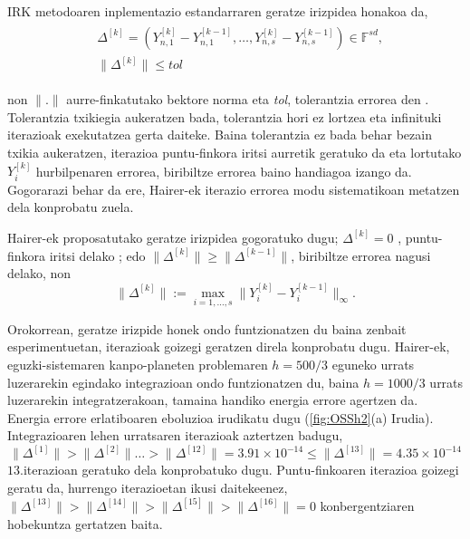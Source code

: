 IRK metodoaren inplementazio estandarraren geratze irizpidea honakoa da,
\begin{align}
\begin{split}
&\Delta^{[k]}=(Y_{n,1}^{[k]}-Y_{n,1}^{[k-1]},\dots,Y_{n,s}^{[k]}-Y_{n,s}^{[k-1]}) \in \mathbb{F}^{sd},\\
&\|\Delta^{[k]}\| \leqslant tol
\end{split}
\end{align} 

non $\|.\|$ aurre-finkatutako bektore norma eta \emph{tol}, tolerantzia errorea den . Tolerantzia txikiegia aukeratzen bada, tolerantzia hori ez lortzea eta infinituki iterazioak exekutatzea gerta daiteke. Baina tolerantzia ez bada behar bezain txikia aukeratzen, iterazioa puntu-finkora iritsi aurretik geratuko da eta lortutako $Y_i^{[k]}$ hurbilpenaren errorea, biribiltze errorea baino  handiagoa izango da. Gogorarazi behar da ere, Hairer-ek \cite{Hairer2008} iterazio errorea modu sistematikoan metatzen dela konprobatu zuela.   

Hairer-ek proposatutako geratze irizpidea gogoratuko dugu; $\Delta^{[k]} = 0$ , puntu-finkora iritsi delako ;  edo   $\|\Delta^{[k]}\| \geqslant \|\Delta^{[k-1]}\|$, biribiltze errorea nagusi delako,
non
\begin{equation*}
\|\Delta^{[k]}\|:= \max_{i=1,\dots,s} \|Y_i^{[k]}-Y_i^{[k-1]}\|_{\infty}.
\end{equation*}


Orokorrean, geratze irizpide honek ondo funtzionatzen du baina zenbait esperimentuetan, iterazioak goizegi geratzen direla konprobatu dugu. Hairer-ek, eguzki-sistemaren kanpo-planeten problemaren $h=500/3$ eguneko urrats luzerarekin egindako integrazioan ondo funtzionatzen du, baina $h=1000/3$ urrats luzerarekin integratzerakoan, tamaina handiko energia errore agertzen da. Energia errore erlatiboaren eboluzioa irudikatu dugu (\ref{fig:OSSh2}(a) Irudia). Integrazioaren lehen urratsaren iterazioak aztertzen badugu,
\begin{equation*}
\|\Delta^{[1]}\|>\|\Delta^{[2]}\| \dots > \|\Delta^{[12]}\|=3.91\times 10^{-14} \leqslant \|\Delta^{[13]}\|=4.35 \times 10^{-14} 
\end{equation*} 
$13.$iterazioan geratuko dela konprobatuko dugu. Puntu-finkoaren iterazioa goizegi geratu da, hurrengo iterazioetan ikusi daitekeenez, $\|\Delta^{[13]}\|>\|\Delta^{[14]}\|>\|\Delta^{[15]}\|>\|\Delta^{[16]}\|=0$ konbergentziaren hobekuntza gertatzen baita. 

